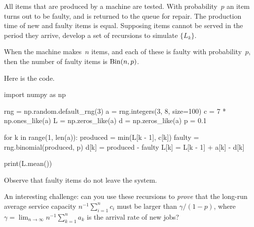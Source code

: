 \documentclass[queueing-book.tex]{subfiles}
\begin{document}
\begin{exercise}
\label{ex:88}
All items
 that are produced by a machine are tested. With probability~$p$ an item turns out to be faulty, and is returned to the queue for repair. The production time of new and faulty items is equal.  Supposing  items cannot be served in the period they arrive,   develop a set of recursions to simulate $\{L_k\}$.
 \begin{hint}
 When the machine makes~$n$ items, and each of these is faulty with probability~$p$, then the number of faulty items is $\mathrm{Bin}(n, p)$.
 \end{hint}
\begin{solution}
Here is the code.
\begin{python}
import numpy as np

rng = np.random.default_rng(3)
a = rng.integers(3, 8, size=100)
c = 7 * np.ones_like(a)
L = np.zeros_like(a)
d = np.zeros_like(a)
p = 0.1

for k in range(1, len(a)):
    produced = min(L[k - 1], c[k])
    faulty = rng.binomial(produced, p)
    d[k] = produced - faulty
    L[k] = L[k - 1] + a[k] - d[k]

print(L.mean())
  \end{python}
Observe that faulty items do not leave the system.

An interesting challenge:  can you use these recursions to \emph{prove} that the long-run average service capacity $n^{-1}\sum_{i=1}^n c_i$ must be larger than $\gamma/(1-p)$, where $\gamma = \lim_{n\to \infty} n^{-1}\sum_{k=1}^n a_k$ is the arrival rate of new jobs?
\end{solution}
\end{exercise}
\end{document}
